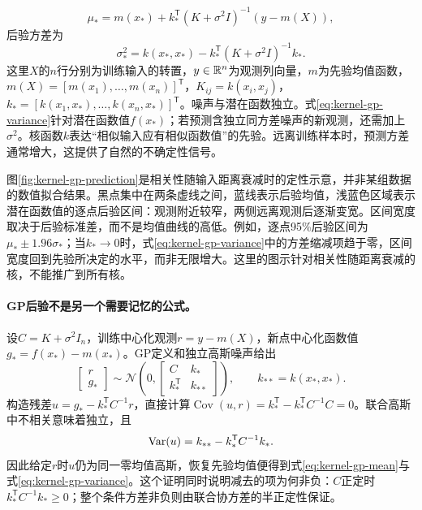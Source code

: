 \begin{equation}
 \mu_* = m(x_*)+k_*^{\mathsf T}(K+\sigma^2I)^{-1}(y-m(X)),\label{eq:kernel-gp-mean}
\end{equation}
后验方差为
\begin{equation}
 \sigma_*^2=k(x_*,x_*)-k_*^{\mathsf T}(K+\sigma^2I)^{-1}k_*.\label{eq:kernel-gp-variance}
\end{equation}
这里$X$的$n$行分别为训练输入的转置，$y\in\mathbb{R}^n$为观测列向量，$m$为先验均值函数，$m(X)=[m(x_1),\ldots,m(x_n)]^{\mathsf T}$，$K_{ij}=k(x_i,x_j)$，$k_*=[k(x_1,x_*),\ldots,k(x_n,x_*)]^{\mathsf T}$。噪声与潜在函数独立。式\eqref{eq:kernel-gp-variance}针对潜在函数值$f(x_*)$；若预测含独立同方差噪声的新观测，还需加上$\sigma^2$。核函数$k$表达“相似输入应有相似函数值”的先验。远离训练样本时，预测方差通常增大，这提供了自然的不确定性信号。

图\ref{fig:kernel-gp-prediction}是相关性随输入距离衰减时的定性示意，并非某组数据的数值拟合结果。黑点集中在两条虚线之间，蓝线表示后验均值，浅蓝色区域表示潜在函数值的逐点后验区间：观测附近较窄，两侧远离观测后逐渐变宽。区间宽度取决于后验标准差，而不是均值曲线的高低。例如，逐点95\%后验区间为$\mu_*\pm1.96\sigma_*$；当$k_*\to0$时，式\eqref{eq:kernel-gp-variance}中的方差缩减项趋于零，区间宽度回到先验所决定的水平，而非无限增大。这里的图示针对相关性随距离衰减的核，不能推广到所有核。
\paragraph{GP后验不是另一个需要记忆的公式。}
设$C=K+\sigma^2I_n$，训练中心化观测$r=y-m(X)$，新点中心化函数值$g_*=f(x_*)-m(x_*)$。GP定义和独立高斯噪声给出
\begin{equation}
 \begin{bmatrix}r\\g_*\end{bmatrix}\sim\mathcal N\left(0,
 \begin{bmatrix}C&k_*\\k_*^{\mathsf T}&k_{**}\end{bmatrix}\right),
 \qquad k_{**}=k(x_*,x_*).
\end{equation}
构造残差$u=g_*-k_*^{\mathsf T}C^{-1}r$，直接计算$\operatorname{Cov}(u,r)=k_*^{\mathsf T}-k_*^{\mathsf T}C^{-1}C=0$。联合高斯中不相关意味着独立，且
\begin{equation}
 \operatorname{Var}(u)=k_{**}-k_*^{\mathsf T}C^{-1}k_*.
\end{equation}
因此给定$r$时$u$仍为同一零均值高斯，恢复先验均值便得到式\eqref{eq:kernel-gp-mean}与式\eqref{eq:kernel-gp-variance}。这个证明同时说明减去的项为何非负：$C$正定时$k_*^{\mathsf T}C^{-1}k_*\geq0$；整个条件方差非负则由联合协方差的半正定性保证。

